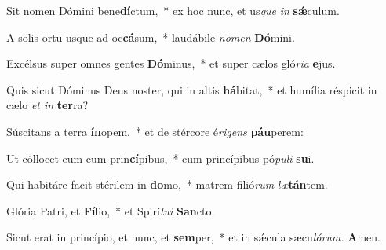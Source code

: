 \item Sit nomen Dómini bene\textbf{dí}ctum,~* ex hoc nunc, et us\tinyhspace\textit{que} \textit{in} \textbf{sǽ}culum.
\item A solis ortu usque ad oc\textbf{cá}sum,~* laudábile \textit{nomen} \textbf{Dó}mini.
\item Excélsus super omnes gentes \textbf{Dó}minus,~* et super cælos gló\textit{ria} \textbf{e}jus.
\item Quis sicut Dóminus Deus noster, qui in altis \textbf{há}bitat,~* et humília réspicit in cælo \textit{et in} \textbf{ter}ra?
\item Súscitans a terra \textbf{ín}opem,~* et de stércore é\tinyhspace\textit{rigens} \textbf{páu}perem:
\item Ut cóllocet eum cum prin\textbf{cí}pibus,~* cum princípibus pó\textit{puli} \textbf{su}i.
\item Qui habitáre facit stérilem in \textbf{do}mo,~* matrem filió\textit{rum} \textit{læ}\textbf{tán}tem.
\item Glória Patri, et \textbf{Fí}lio,~* et Spirí\tinyhspace\textit{tui} \textbf{San}cto.
\item Sicut erat in princípio, et nunc, et \textbf{sem}per,~* et in sǽcula sæcu\tinyhspace\textit{lórum.} \textbf{A}men.
